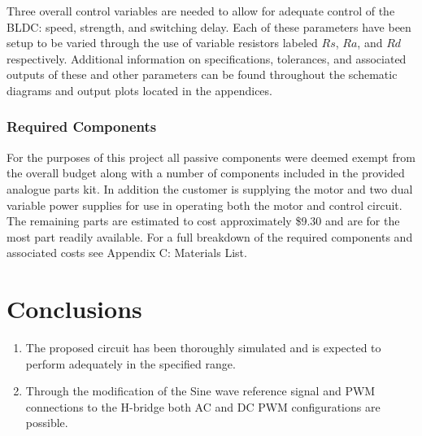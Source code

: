 \documentclass[12pt]{article}
\begin{document}
Three overall control variables are needed to allow for adequate control of the BLDC: speed, strength, and switching delay. Each of these parameters have been setup to be varied through the use of variable resistors labeled $Rs$, $Ra$, and $Rd$ respectively. Additional information on specifications, tolerances, and associated outputs of these and other parameters can be found throughout the schematic diagrams and output plots located in the appendices.

\subsubsection{Required Components}

For the purposes of this project all passive components were deemed exempt from the overall budget along with a number of components included in the provided analogue parts kit. In addition the customer is supplying the motor and two dual variable power supplies for use in operating both the motor and control circuit. The remaining parts are estimated to cost approximately \$9.30 and are for the most part readily available. For a full breakdown of the required components and associated costs see Appendix C: Materials List.

\section{Conclusions}

\begin{enumerate}
    \item The proposed circuit has been thoroughly simulated and is expected to perform adequately in the specified range.
    \item Through the modification of the Sine wave reference signal and PWM connections to the H-bridge both AC and DC PWM configurations are possible.
\end{enumerate}

\pagebreak
\end{document}
